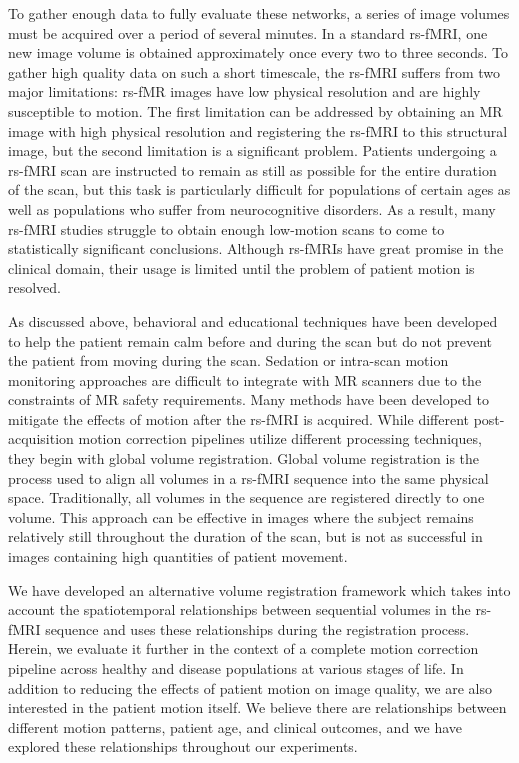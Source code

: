 To gather enough data to fully evaluate these networks, a series of image volumes must be acquired over a period of several minutes. In a standard rs-fMRI, one new image volume is obtained approximately once every two to three seconds. To gather high quality data on such a short timescale, the rs-fMRI suffers from two major limitations: rs-fMR images have low physical resolution and are highly susceptible to motion. The first limitation can be addressed by obtaining an MR image with high physical resolution and registering the rs-fMRI to this structural image, but the second limitation is a significant problem. Patients undergoing a rs-fMRI scan are instructed to remain as still as possible for the entire duration of the scan, but this task is particularly difficult for populations of certain ages as well as populations who suffer from neurocognitive disorders. As a result, many rs-fMRI studies struggle to obtain enough low-motion scans to come to statistically significant conclusions. Although rs-fMRIs have great promise in the clinical domain, their usage is limited until the problem of patient motion is resolved.

As discussed above, behavioral and educational techniques have been developed to help the patient remain calm before and during the scan but do not prevent the patient from moving during the scan. Sedation or intra-scan motion monitoring approaches are difficult to integrate with MR scanners due to the constraints of MR safety requirements. Many methods have been developed to mitigate the effects of motion after the rs-fMRI is acquired. While different post-acquisition motion correction pipelines utilize different processing techniques, they begin with global volume registration. Global volume registration is the process used to align all volumes in a rs-fMRI sequence into the same physical space. Traditionally, all volumes in the sequence are registered directly to one volume. This approach can be effective in images where the subject remains relatively still throughout the duration of the scan, but is not as successful in images containing high quantities of patient movement.

We have developed an alternative volume registration framework which takes into account the spatiotemporal relationships between sequential volumes in the rs-fMRI sequence and uses these relationships during the registration process. Herein, we evaluate it further in the context of a complete motion correction pipeline across healthy and disease populations at various stages of life. In addition to reducing the effects of patient motion on image quality, we are also interested in the patient motion itself. We believe there are relationships between different motion patterns, patient age, and clinical outcomes, and we have explored these relationships throughout our experiments.

